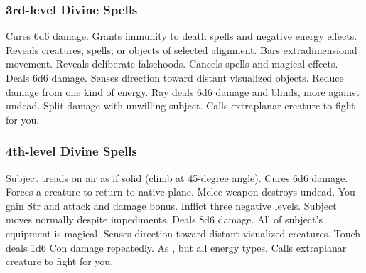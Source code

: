 \subsubsection{3rd-level Divine Spells}
\begin{spelllist}
     Cures 6d6 damage.
     Grants immunity to death spells and negative energy effects.
     Reveals creatures, spells, or objects of selected alignment.
     Bars extradimensional movement.
     Reveals deliberate falsehoods.
     Cancels spells and magical effects.
     Deals 6d6 damage.
     Senses direction toward distant visualized objects.
     Reduce damage from one kind of energy.
     Ray deals 6d6 damage and blinds, more against undead.
      Split damage with unwilling subject.
     Calls extraplanar creature to fight for you.
\end{spelllist}

\subsubsection{4th-level Divine Spells}
\begin{spelllist}
     Subject treads on air as if solid (climb at 45-degree angle).
     Cures 6d6 damage.
     Forces a creature to return to native plane.
     Melee weapon destroys undead.
     You gain  Str and attack and damage bonus.
     Inflict three negative levels.
     Subject moves normally despite impediments.
     Deals 8d6 damage.
     All of subject's equipment is magical.
     Senses direction toward distant visualized creatures.
     Touch deals 1d6 Con damage repeatedly.
     As , but all energy types.
     Calls extraplanar creature to fight for you.
\end{spelllist}

